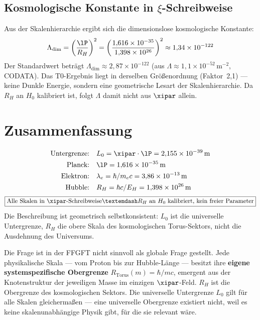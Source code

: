 \subsection{Kosmologische Konstante in \texorpdfstring{$\xi$}{xi}-Schreibweise}

Aus der Skalenhierarchie ergibt sich die dimensionslose kosmologische Konstante:
\begin{equation}
	\Lambda_{\text{dim}} = \left(\frac{\lP}{R_H}\right)^2 = \left(\frac{1{,}616 \times 10^{-35}}{1{,}398 \times 10^{26}}\right)^2 \approx 1{,}34 \times 10^{-122}
\end{equation}
Der Standardwert beträgt $\Lambda_{\text{dim}} \approx 2{,}87 \times 10^{-122}$ (aus $\Lambda \approx 1{,}1 \times 10^{-52}\,\text{m}^{-2}$, CODATA). Das T0-Ergebnis liegt in derselben Größenordnung (Faktor~2{,}1) — keine Dunkle Energie, sondern eine geometrische Lesart der Skalenhierarchie. Da $R_H$ an $H_0$ kalibriert ist, folgt $\Lambda$ damit nicht aus $\xipar$ allein.

\section{Zusammenfassung}

\begin{keyresult}
\begin{align}
	\text{Untergrenze:} \quad & L_0 = \xipar \cdot \lP = 2{,}155 \times 10^{-39}\,\text{m} \notag \\
	\text{Planck:} \quad & \lP = 1{,}616 \times 10^{-35}\,\text{m} \notag \\
	\text{Elektron:} \quad & \lambda_e = \hbar/m_e c = 3{,}86 \times 10^{-13}\,\text{m} \notag \\
	\text{Hubble:} \quad & R_H = \hbar c/E_H = 1{,}398 \times 10^{26}\,\text{m} \notag
\end{align}
\begin{equation}
	\boxed{\text{Alle Skalen in } \xipar\text{-Schreibweise} — R_H \text{ an } H_0 \text{ kalibriert, kein freier Parameter}}
\end{equation}
Die Beschreibung ist geometrisch selbstkonsistent: $L_0$ ist die universelle Untergrenze, $R_H$ die obere Skala des kosmologischen Torus-Sektors, nicht die Ausdehnung des Universums.

\begin{keyresult}
Die Frage ist in der FFGFT nicht sinnvoll als globale Frage gestellt. Jede physikalische Skala — vom Proton bis zur Hubble-Länge — besitzt ihre \textbf{eigene systemspezifische Obergrenze} $R_\text{Torus}(m) = \hbar/mc$, emergent aus der Knotenstruktur der jeweiligen Masse im einzigen $\xipar$-Feld. $R_H$ ist die Obergrenze des kosmologischen Sektors. Die universelle Untergrenze $L_0$ gilt für alle Skalen gleichermaßen — eine universelle Obergrenze existiert nicht, weil es keine skalenunabhängige Physik gibt, für die sie relevant wäre.
\end{keyresult}
\end{keyresult}


